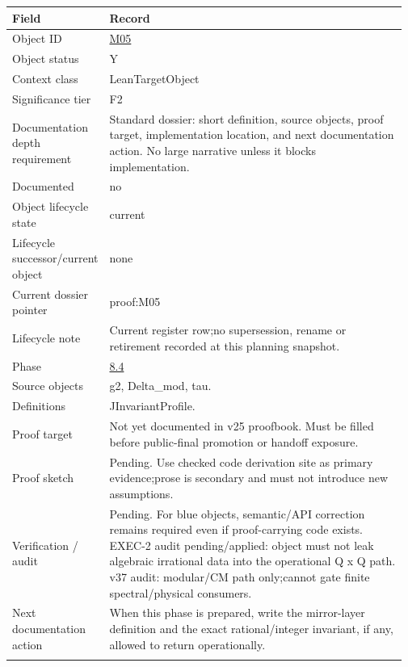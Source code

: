 \begin{longtable}{L{0.16\linewidth} L{0.81\linewidth}}
\hline
\textbf{Field} & \textbf{Record}\\
\hline
Object ID & \hyperlink{object-row-M05}{M05}\\
\hline\addlinespace[0.20em]
Object status & Y\\
\hline\addlinespace[0.20em]
Context class & LeanTargetObject\\
\hline\addlinespace[0.20em]
Significance tier & F2\\
\hline\addlinespace[0.20em]
Documentation depth requirement & Standard dossier: short definition, source objects, proof target, implementation location, and next documentation action. No large narrative unless it blocks implementation.\\
\hline\addlinespace[0.20em]
Documented & no\\
\hline\addlinespace[0.20em]
Object lifecycle state & current\\
\hline\addlinespace[0.20em]
Lifecycle successor/\allowbreak{}current object & none\\
\hline\addlinespace[0.20em]
Current dossier pointer & proof:M05\\
\hline\addlinespace[0.20em]
Lifecycle note & Current register row;\newline no supersession, rename or retirement recorded at this planning snapshot.\\
\hline\addlinespace[0.20em]
Phase & \hyperlink{phase-row-8-4}{8.4}\\
\hline\addlinespace[0.20em]
Source objects & g2, Delta\_mod, tau.\\
\hline\addlinespace[0.20em]
Definitions & JInvariantProfile.\\
\hline\addlinespace[0.20em]
Proof target & Not yet documented in v25 proofbook. Must be filled before public-final promotion or handoff exposure.\\
\hline\addlinespace[0.20em]
Proof sketch & Pending. Use checked code derivation site as primary evidence;\newline prose is secondary and must not introduce new assumptions.\\
\hline\addlinespace[0.20em]
Verification /\allowbreak{} audit & Pending. For blue objects, semantic/\allowbreak{}API correction remains required even if proof-carrying code exists. EXEC-2 audit pending/\allowbreak{}applied: object must not leak algebraic irrational data into the operational Q x Q path. v37 audit: modular/\allowbreak{}CM path only;\newline cannot gate finite spectral/\allowbreak{}physical consumers.\\
\hline\addlinespace[0.20em]
Next documentation action & When this phase is prepared, write the mirror-layer definition and the exact rational/\allowbreak{}integer invariant, if any, allowed to return operationally.\\
\hline\addlinespace[0.20em]
\end{longtable}
